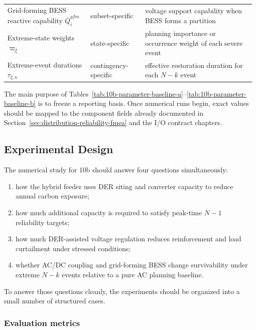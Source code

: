 \begin{table}[t]
\begin{tabular}{L{0.34\textwidth}L{0.22\textwidth}L{0.34\textwidth}}
Grid-forming BESS reactive capability \(\overline Q_i^{gfm}\) & subset-specific & voltage support capability when BESS forms a partition \\
Extreme-state weights \(\varpi_\xi\) & state-specific & planning importance or occurrence weight of each severe event \\
Extreme-event durations \(\tau_{\xi,\kappa}\) & contingency-specific & effective restoration duration for each \(N{-}k\) event \\
\bottomrule
\end{tabular}
\end{table}

The main purpose of Tables~\ref{tab:10b-parameter-baseline-a}--\ref{tab:10b-parameter-baseline-b} is to freeze a reporting basis. Once numerical runs begin, exact values should be mapped to the component fields already documented in Section~\ref{sec:distribution-reliability-fmea} and the I/O contract chapters.

\subsection{Experimental Design}

The numerical study for 10b should answer four questions simultaneously:
\begin{enumerate}
  \item how the hybrid feeder uses DER siting and converter capacity to reduce annual carbon exposure;
  \item how much additional capacity is required to satisfy peak-time \(N{-}1\) reliability targets;
  \item how much DER-assisted voltage regulation reduces reinforcement and load curtailment under stressed conditions;
  \item whether AC/DC coupling and grid-forming BESS change survivability under extreme \(N{-}k\) events relative to a pure AC planning baseline.
\end{enumerate}

To answer those questions cleanly, the experiments should be organized into a small number of structured cases.

\subsubsection{Evaluation metrics}

